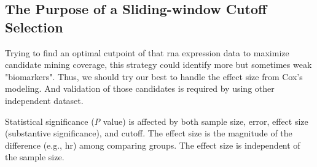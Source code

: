 \documentclass[jpm,article,submit,moreauthors,pdftex]{Definitions/mdpi}
\newenvironment{MyColorPar}[1]{%
    \leavevmode\color{#1}\ignorespaces%
}{%
}%
\begin{document}
\begin{paracol}{2}
\begin{MyColorPar}{red}
\subsection{The Purpose of a Sliding-window Cutoff Selection}

Trying to find an optimal cutpoint of that \acrshort{rna} expression data to maximize candidate mining coverage, this strategy could identify more but sometimes weak "biomarkers".
Thus, we should try our best to handle the effect size from Cox's modeling.
And validation of those candidates is required by using other independent dataset.

Statistical significance (\textit{P} value) is affected by both sample size, error, effect size (substantive significance)\cite{Sullivan2012}\cite{Thiese2016}, and cutoff. 
The effect size is the magnitude of the difference (e.g., \acrlong{hr}) among comparing groups.
The effect size is independent of the sample size\cite{Sullivan2012}.



\end{MyColorPar}
\end{paracol}
\end{document}
